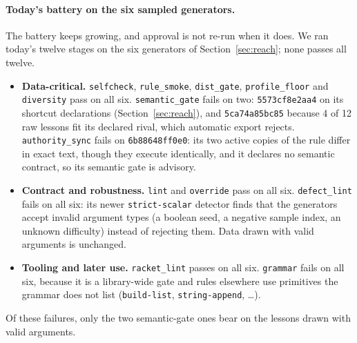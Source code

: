 \documentclass[11pt]{article}
\newcommand{\gen}[1]{\texttt{#1}}
\begin{document}
\paragraph{Today's battery on the six sampled generators.} The battery keeps
growing, and approval is not re-run when it does. We ran today's twelve stages
on the six generators of Section~\ref{sec:reach}; none passes all twelve.
\begin{itemize}[nosep]
  \item \textbf{Data-critical.} \texttt{selfcheck}, \texttt{rule\_smoke},
  \texttt{dist\_gate}, \texttt{profile\_floor} and \texttt{diversity} pass on
  all six. \texttt{semantic\_gate} fails on two: \gen{5573cf8e2aa4} on its
  shortcut declarations (Section~\ref{sec:reach}), and \gen{5ca74a85bc85}
  because 4 of 12 raw lessons fit its declared rival, which automatic export
  rejects. \texttt{authority\_sync} fails on \gen{6b88648ff0e0}: its two
  active copies of the rule differ in exact text, though they execute
  identically, and it declares no semantic contract, so its semantic gate is
  advisory.
  \item \textbf{Contract and robustness.} \texttt{lint} and \texttt{override}
  pass on all six. \texttt{defect\_lint} fails on all six: its newer
  \texttt{strict-scalar} detector finds that the generators accept invalid
  argument types (a boolean seed, a negative sample index, an unknown
  difficulty) instead of rejecting them. Data drawn with valid arguments is
  unchanged.
  \item \textbf{Tooling and later use.} \texttt{racket\_lint} passes on all
  six. \texttt{grammar} fails on all six, because it is a library-wide gate
  and rules elsewhere use primitives the grammar does not list
  (\texttt{build-list}, \texttt{string-append}, \dots).
\end{itemize}
Of these failures, only the two semantic-gate ones bear on the lessons drawn
with valid arguments.
\end{document}
